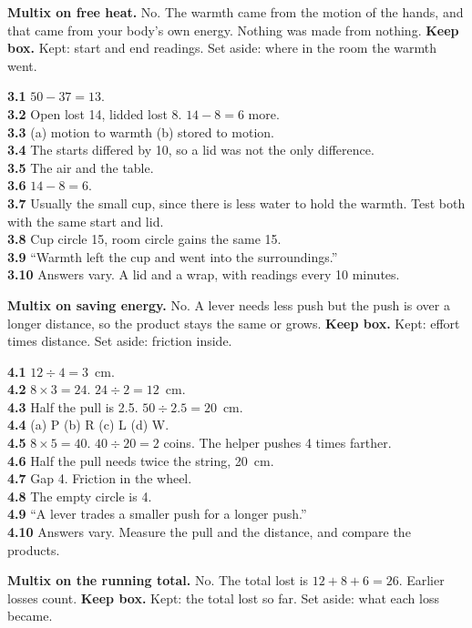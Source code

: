 \textbf{Multix on free heat.} No. The warmth came from the motion of the hands, and that came from your body's own energy. Nothing was made from nothing. \textbf{Keep box.} Kept: start and end readings. Set aside: where in the room the warmth went.

\textbf{3.1} $50-37=13$.\\
\textbf{3.2} Open lost 14, lidded lost 8. $14-8=6$ more.\\
\textbf{3.3} (a) motion to warmth (b) stored to motion.\\
\textbf{3.4} The starts differed by 10, so a lid was not the only difference.\\
\textbf{3.5} The air and the table.\\
\textbf{3.6} $14-8=6$.\\
\textbf{3.7} Usually the small cup, since there is less water to hold the warmth. Test both with the same start and lid.\\
\textbf{3.8} Cup circle 15, room circle gains the same 15.\\
\textbf{3.9} ``Warmth left the cup and went into the surroundings.''\\
\textbf{3.10} Answers vary. A lid and a wrap, with readings every 10 minutes.

\textbf{Multix on saving energy.} No. A lever needs less push but the push is over a longer distance, so the product stays the same or grows. \textbf{Keep box.} Kept: effort times distance. Set aside: friction inside.

\textbf{4.1} $12\div4=3$~cm.\\
\textbf{4.2} $8\times3=24$. $24\div2=12$~cm.\\
\textbf{4.3} Half the pull is 2.5. $50\div2.5=20$~cm.\\
\textbf{4.4} (a) P (b) R (c) L (d) W.\\
\textbf{4.5} $8\times5=40$. $40\div20=2$ coins. The helper pushes 4 times farther.\\
\textbf{4.6} Half the pull needs twice the string, 20~cm.\\
\textbf{4.7} Gap 4. Friction in the wheel.\\
\textbf{4.8} The empty circle is 4.\\
\textbf{4.9} ``A lever trades a smaller push for a longer push.''\\
\textbf{4.10} Answers vary. Measure the pull and the distance, and compare the products.

\textbf{Multix on the running total.} No. The total lost is $12+8+6=26$. Earlier losses count. \textbf{Keep box.} Kept: the total lost so far. Set aside: what each loss became.


